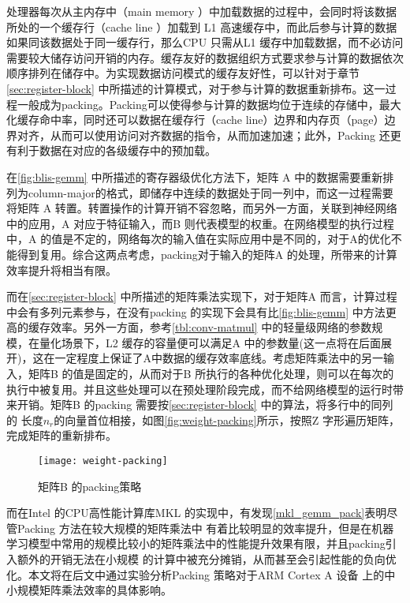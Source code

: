 处理器每次从主内存中（main memory ）中加载数据的过程中，会同时将该数据所处的一个缓存行（cache line ）加载到 L1 高速缓存中，而此后参与计算的数据如果同该数据处于同一缓存行，那么CPU 只需从L1 缓存中加载数据，而不必访问需要较大储存访问开销的内存。缓存友好的数据组织方式要求参与计算的数据依次顺序排列在储存中。为实现数据访问模式的缓存友好性，可以针对于章节\ref{sec:register-block} 中所描述的计算模式，对于参与计算的数据重新排布。这一过程一般成为packing。Packing可以使得参与计算的数据均位于连续的存储中，最大化缓存命中率，同时还可以数据在缓存行（cache line）边界和内存页（page）边界对齐，从而可以使用访问对齐数据的指令，从而加速加速；此外，Packing 还更有利于数据在对应的各级缓存中的预加载。

在\ref{fig:blis-gemm} 中所描述的寄存器级优化方法下，矩阵 A 中的数据需要重新排列为column-major的格式，即储存中连续的数据处于同一列中，而这一过程需要将矩阵 A 转置。转置操作的计算开销不容忽略，而另外一方面，关联到神经网络中的应用，A 对应于特征输入，而B 则代表模型的权重。在网络模型的执行过程中，A 的值是不定的，网络每次的输入值在实际应用中是不同的，对于A的优化不能得到复用。综合这两点考虑，packing对于输入的矩阵A 的处理，所带来的计算效率提升将相当有限。

而在\ref{sec:register-block} 中所描述的矩阵乘法实现下，对于矩阵A 而言，计算过程中会有多列元素参与，在没有packing 的实现下会具有比\ref{fig:blis-gemm} 中方法更高的缓存效率。另外一方面，参考\ref{tbl:conv-matmul} 中的轻量级网络的参数规模，在量化场景下，L2 缓存的容量便可以满足A 中的参数量(这一点将在后面展开)，这在一定程度上保证了A中数据的缓存效率底线。考虑矩阵乘法中的另一输入，矩阵B 的值是固定的，从而对于B 所执行的各种优化处理，则可以在每次的执行中被复用。并且这些处理可以在预处理阶段完成，而不给网络模型的运行时带来开销。矩阵B 的packing 需要按\ref{sec:register-block} 中的算法，将多行中的同列的 长度$n_r$的向量首位相接，如图\ref{fig:weight-packing}所示，按照Z 字形遍历矩阵，完成矩阵的重新排布。 

\begin{figure}
  \centering
  \texttt{[image: weight-packing]}
  \caption{矩阵B 的packing策略}
  \label{fig:weight-pack}
\end{figure}

而在Intel 的CPU高性能计算库MKL 的实现中，有发现\ref{mkl_gemm_pack}表明尽管Packing 方法在较大规模的矩阵乘法中
有着比较明显的效率提升，但是在机器学习模型中常用的规模比较小的矩阵乘法中的性能提升效果有限，并且packing引入额外的开销无法在小规模
的计算中被充分摊销，从而甚至会引起性能的负向优化。本文将在后文中通过实验分析Packing 策略对于ARM Cortex A 设备
上的中小规模矩阵乘法效率的具体影响。

